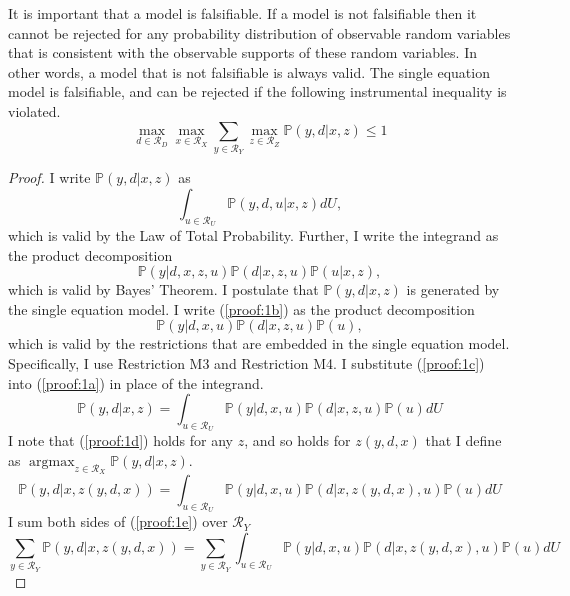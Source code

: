 \documentclass[10pt,a4paper,twoside]{article}
\DeclareMathOperator*{\argmax}{argmax}
\numberwithin{equation}{section}
\begin{document}
It is important that a model is falsifiable. If a model is not falsifiable then it cannot be rejected for any probability distribution of observable random variables that is consistent with the observable supports of these random variables. In other words, a model that is not falsifiable is always valid. The single equation model is falsifiable, and can be rejected if the following instrumental inequality is violated.
\begin{equation}
\max_{d\in\mathcal{R}_D}\max_{x\in\mathcal{R}_X}\sum_{y\in\mathcal{R}_Y}\max_{z\in\mathcal{R}_Z}\mathbb{P}(y,d|x,z)\leq 1\label{eq:false}
\end{equation}
\vspace{20pt} 
\begin{proof}
I write $\mathbb{P}(y,d|x,z)$ as 
\begin{equation}
\int_{u\in\mathcal{R}_U}\mathbb{P}(y,d,u|x,z)dU,\label{proof:1a}
\end{equation}
which is valid by the Law of Total Probability. Further, I write the integrand as the product decomposition 
\begin{equation}
\mathbb{P}(y|d,x,z,u)\mathbb{P}(d|x,z,u)\mathbb{P}(u|x,z),\label{proof:1b}
\end{equation}
which is valid by Bayes' Theorem. I postulate that $\mathbb{P}(y,d|x,z)$ is generated by the single equation model. I write (\ref{proof:1b}) as the product decomposition
\begin{equation}
\mathbb{P}(y|d,x,u)\mathbb{P}(d|x,z,u)\mathbb{P}(u),\label{proof:1c}
\end{equation}
which is valid by the restrictions that are embedded in the single equation model. Specifically, I use Restriction M3 and Restriction M4. I substitute (\ref{proof:1c}) into (\ref{proof:1a}) in place of the integrand. 
\begin{equation}
\mathbb{P}(y,d|x,z)=\int_{u\in\mathcal{R}_U}\mathbb{P}(y|d,x,u)\mathbb{P}(d|x,z,u)\mathbb{P}(u)dU\label{proof:1d}
\end{equation}
I note that (\ref{proof:1d}) holds for any $z$, and so holds for $z(y,d,x)$ that I define as $\argmax_{z\in\mathcal{R}_X}\mathbb{P}(y,d|x,z)$. 
\begin{equation}
\mathbb{P}(y,d|x,z(y,d,x))=\int_{u\in\mathcal{R}_U}\mathbb{P}(y|d,x,u)\mathbb{P}(d|x,z(y,d,x),u)\mathbb{P}(u)dU\label{proof:1e}
\end{equation}
I sum both sides of (\ref{proof:1e}) over $\mathcal{R}_Y$
\begin{equation}
\sum_{y\in\mathcal{R}_Y}\mathbb{P}(y,d|x,z(y,d,x))=\sum_{y\in\mathcal{R}_Y}\int_{u\in\mathcal{R}_U}\mathbb{P}(y|d,x,u)\mathbb{P}(d|x,z(y,d,x),u)\mathbb{P}(u)dU\nonumber

\end{equation}
\end{proof}
\end{document}
